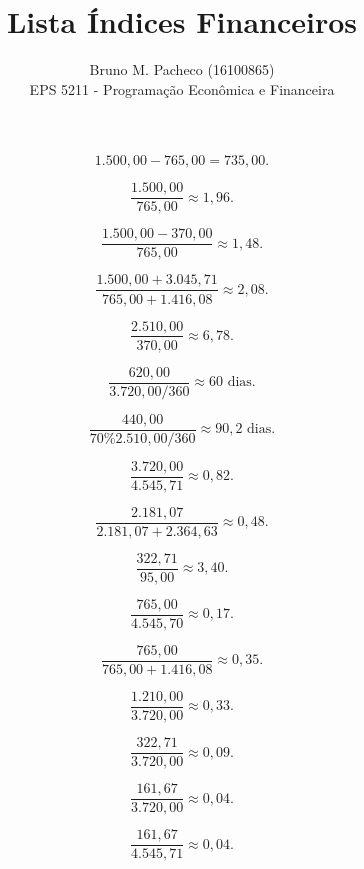 \documentclass[a4paper]{report}
\begin{document}
 
\title{Lista Índices Financeiros}
\author{Bruno M. Pacheco (16100865)\\
EPS 5211 - Programação Econômica e Financeira}
 
\maketitle
 


\[
    1.500,00 - 765,00 = 735,00
.\] 

\[
\frac{1.500,00}{765,00} \approx 1,96
.\] 


\[
\frac{1.500,00 - 370,00}{765,00} \approx 1,48
.\] 


\[
\frac{1.500,00 + 3.045,71}{765,00 + 1.416,08} \approx 2,08
.\] 



\[
\frac{2.510,00}{370,00} \approx 6,78
.\] 


\[
\frac{620,00}{3.720,00 / 360} \approx 60 \text{ dias}
.\] 


\[
\frac{440,00}{70\% 2.510,00 / 360} \approx 90,2 \text{ dias}
.\] 


\[
\frac{3.720,00}{4.545,71} \approx 0,82
.\]



\[
\frac{2.181,07}{2.181,07+2.364,63} \approx 0,48
.\]


\[
\frac{322,71}{95,00} \approx 3,40
.\]


\[
\frac{765,00}{4.545,70} \approx 0,17
.\]


\[
\frac{765,00}{765,00+1.416,08} \approx 0,35
.\]



\[
\frac{1.210,00}{3.720,00} \approx 0,33
.\] 


\[
\frac{322,71}{3.720,00} \approx 0,09
.\]


\[
    \frac{161,67}{3.720,00} \approx 0,04
.\]


\[
\frac{161,67}{4.545,71} \approx 0,04
.\]
\end{document}
